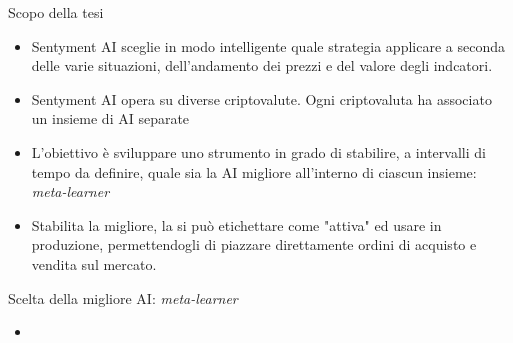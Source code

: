 \documentclass{beamer}
\begin{document}
\begin{frame}{Scopo della tesi}
\begin{itemize}
\item Sentyment AI sceglie in modo intelligente quale strategia applicare a seconda delle varie situazioni,
dell'andamento dei prezzi e del valore degli indcatori.
\item Sentyment AI opera su diverse criptovalute. Ogni criptovaluta ha associato un insieme di AI separate
\item L'obiettivo è sviluppare uno strumento in grado di stabilire, a intervalli di tempo da definire,
quale sia la AI migliore all'interno di ciascun insieme: \textit{meta-learner}
\item Stabilita la migliore, la si può etichettare come "attiva" ed usare in produzione, permettendogli di piazzare direttamente ordini di acquisto e vendita sul mercato.
\end{itemize}
\end{frame}

\begin{frame}{Scelta della migliore AI: \textit{meta-learner}}
\begin{itemize}
\item
\end{itemize}
\end{frame}
\end{document}
